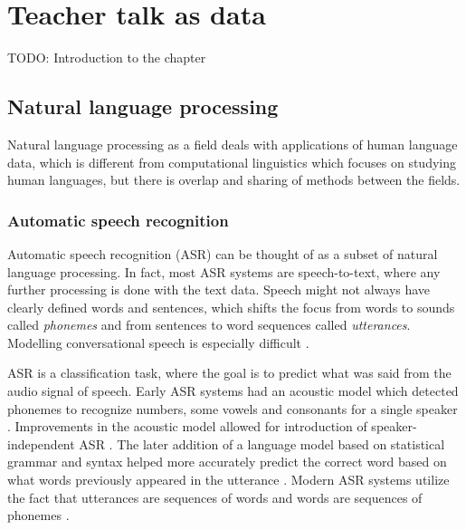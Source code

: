 \documentclass[utf8,english]{gradu3}
\begin{document}
\chapter{Teacher talk as data}
\label{chap:speech}

TODO: Introduction to the chapter

\section{Natural language processing}

Natural language processing as a field deals with applications of human language data, which is different from computational linguistics which focuses on studying human languages, but there is overlap and sharing of methods between the fields.

\subsection{Automatic speech recognition}
Automatic speech recognition (ASR) can be thought of as a subset of natural language processing. In fact, most ASR systems are speech-to-text, where any further processing is done with the text data. Speech might not always have clearly defined words and sentences, which shifts the focus from words to sounds called \emph{phonemes} and from sentences to word sequences called \emph{utterances}. Modelling conversational speech is especially difficult \parencite{kurimoModelingUnderresourcedLanguages2017}.

ASR is a classification task, where the goal is to predict what was said from the audio signal of speech. Early ASR systems had an acoustic model which detected phonemes to recognize numbers, some vowels and consonants for a single speaker \parencite{juangAutomaticSpeechRecognition2005}. Improvements in the acoustic model allowed for introduction of speaker-independent ASR \parencite{benzeghibaAutomaticSpeechRecognition2007,juangAutomaticSpeechRecognition2005}. The later addition of a language model based on statistical grammar and syntax helped more accurately predict the correct word based on what words previously appeared in the utterance \parencite{juangAutomaticSpeechRecognition2005}. Modern ASR systems utilize the fact that utterances are sequences of words and words are sequences of phonemes \parencite{bengioWordEmbeddingsSpeech2014}. 
\end{document}

